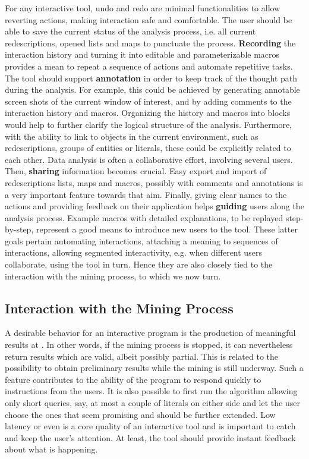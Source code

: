 For any interactive tool, undo and redo are minimal functionalities to
allow reverting actions, making interaction safe and comfortable.  The
user should be able to save the current status of the analysis
process, i.e. all current redescriptions, opened lists and maps to
punctuate the process. \textbf{Recording} the interaction history and
turning it into editable and parameterizable macros provides a mean to
repeat a sequence of actions and automate repetitive tasks.  The tool
should support \textbf{annotation} in order to keep track of the
thought path during the analysis.  For example, this could be achieved
by generating annotable screen shots of the current window of
interest, and by adding comments to the interaction history and
macros.  Organizing the history and macros into blocks would help to further
clarify the logical structure of the analysis.  Furthermore, with
the ability to link to objects in the current environment, such as
redescriptions, groups of entities or literals, these could be
explicitly related to each other.  Data analysis is often a
collaborative effort, involving several users. Then, \textbf{sharing}
information becomes crucial.  Easy export and import of redescriptions
lists, maps and macros, possibly with comments and annotations is a
very important feature towards that aim.  Finally, giving clear names
to the actions and providing feedback on their application helps
\textbf{guiding} users along the analysis process. Example macros with
detailed explanations, to be replayed step-by-step, represent a good
means to introduce new users to the tool.  These latter goals pertain
automating interactions, attaching a meaning to sequences of
interactions, allowing segmented interactivity, e.g. when different
users collaborate, using the tool in turn. Hence they are also closely
tied to the interaction with the mining process, to which we now turn.

\subsection{Interaction with the Mining Process}
\label{sec:goals-interaction}

A desirable behavior for an interactive program is the production of
meaningful results at .  In other words, if the mining
process is stopped, it can nevertheless return results which are
valid, albeit possibly partial.  This is related to the possibility to
obtain preliminary results while the mining is still underway.  Such a
feature contributes to the ability of the program to respond quickly
to instructions from the users.  It is also possible to first run the
algorithm allowing only short queries, say, at most a couple of
literals on either side and let the user choose the ones that seem
promising and should be further extended. Low latency or even
 is a core quality of an interactive tool and is
important to catch and keep the user's attention. At least, the tool
should provide instant feedback about what is happening.

